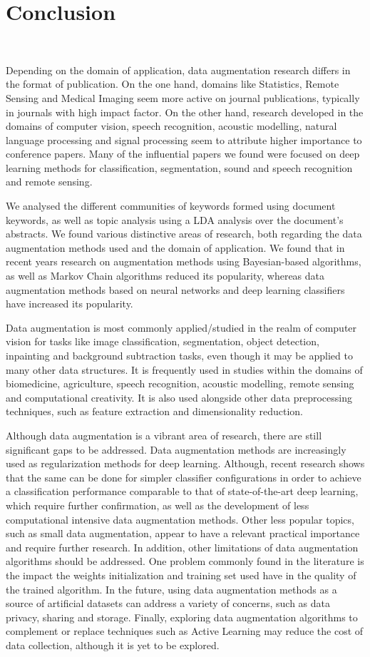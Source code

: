 \section{Conclusion}~\label{sec:conclusion-aug}

Depending on the domain of application, data augmentation research differs in
the format of publication. On the one hand, domains like Statistics, Remote
Sensing and Medical Imaging seem more active on journal publications,
typically in journals with high impact factor. On the other hand, research
developed in the domains of computer vision, speech recognition, acoustic
modelling, natural language processing and signal processing seem to attribute
higher importance to conference papers. Many of the influential papers we found
were focused on deep learning methods for classification, segmentation, sound
and speech recognition and remote sensing.

We analysed the different communities of keywords formed using document
keywords, as well as topic analysis using a LDA analysis over the document's
abstracts. We found various distinctive areas of research, both regarding the
data augmentation methods used and the domain of application. We found that in
recent years research on augmentation methods using Bayesian-based algorithms,
as well as Markov Chain algorithms reduced its popularity, whereas data
augmentation methods based on neural networks and deep learning classifiers
have increased its popularity.

Data augmentation is most commonly applied/studied in the realm of computer
vision for tasks like image classification, segmentation, object detection,
inpainting and background subtraction tasks, even though it may be applied to
many other data structures. It is frequently used in studies within the
domains of biomedicine, agriculture, speech recognition, acoustic modelling,
remote sensing and computational creativity. It is also used alongside other
data preprocessing techniques, such as feature extraction and dimensionality
reduction.

Although data augmentation is a vibrant area of research, there are still
significant gaps to be addressed. Data augmentation methods are increasingly
used as regularization methods for deep learning. Although, recent research
shows that the same can be done for simpler classifier configurations in order
to achieve a classification performance comparable to that of state-of-the-art
deep learning, which require further confirmation, as well as the development
of less computational intensive data augmentation methods. Other less popular
topics, such as small data augmentation, appear to have a relevant practical
importance and require further research. In addition, other limitations of
data augmentation algorithms should be addressed. One problem commonly found
in the literature is the impact the weights initialization and training set
used have in the quality of the trained algorithm. In the future, using data
augmentation methods as a source of artificial datasets can address a variety
of concerns, such as data privacy, sharing and storage. Finally, exploring
data augmentation algorithms to complement or replace techniques such as
Active Learning may reduce the cost of data collection, although it is yet to
be explored.
